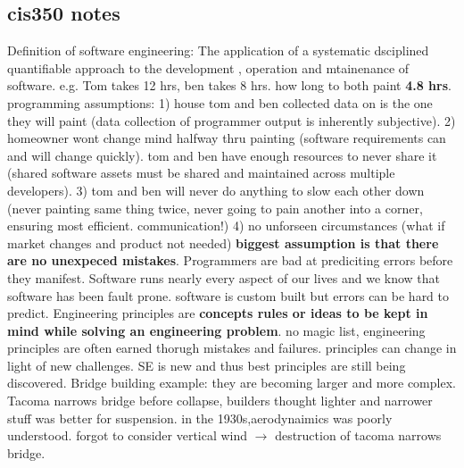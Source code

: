 \documentclass[10pt]{article}
\begin{document}
\begin{landscape}
\begin{multicols*}{6}
\section{cis350 notes}
\tiny
Definition of software engineering: The application of a systematic dsciplined quantifiable approach to the development , operation and mtainenance of software. e.g. Tom takes 12 hrs, ben takes 8 hrs. how long to both paint \textbf{4.8 hrs}.
programming assumptions:  1) house tom and ben collected data on is the one they will paint (data collection of programmer output is inherently subjective). 2) homeowner wont change mind halfway thru painting (software requirements can and will change quickly). tom and ben have enough resources to never share it (shared software assets must be shared and maintained across multiple developers). 3) tom and ben will never do anything to slow each other down (never painting same thing twice, never going to pain another into a corner, ensuring most efficient. communication!) 4) no unforseen circumstances (what if market changes and product not needed) \textbf{biggest assumption is that there are no unexpeced mistakes}.
Programmers are bad at prediciting errors before they manifest. Software runs nearly every aspect of our lives and we know that software has been fault prone. software is custom built but errors can be hard to predict.
Engineering principles are \textbf{concepts rules or ideas to be kept in mind while solving an engineering problem}. no magic list, engineering principles are often earned thorugh mistakes and failures. principles can change in light of new challenges. SE is new and thus best principles are still being discovered. Bridge building example: they are becoming larger and more complex. Tacoma narrows bridge before collapse, builders thought lighter and narrower stuff was better for suspension. in the 1930s,aerodynaimics was poorly understood. forgot to consider vertical wind $\rightarrow$ destruction of tacoma narrows bridge.

\end{multicols*}
\end{landscape}
\end{document}
